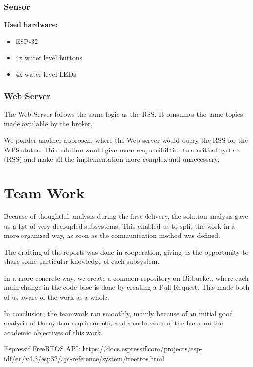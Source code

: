 \documentclass[11pt]{article}
\begin{document}
\subsubsection{Sensor}
\noindent
\textbf{Used hardware:}
\begin{itemize}
	\item ESP-32
	\item 4x water level buttons
	\item 4x water level LEDs
\end{itemize}

\subsubsection{Web Server}

The Web Server follows the same logic as the RSS. It consumes the same topics made available by the broker.

We ponder another approach, where the Web server would query the RSS for the WPS status. This solution would give more responsibilities to a critical system (RSS) and make all the implementation more complex and unnecessary.

\section{Team Work}

Because of thoughtful analysis during the first delivery, the solution analysis gave us a list of very decoupled subsystems. This enabled us to split the work in a more organized way, as soon as the communication method was defined.

The drafting of the reports was done in cooperation, giving us the opportunity to share some particular knowledge of each subsystem.

In a more concrete way, we create a common repository on Bitbucket, where each main change in the code base is done by creating a Pull Request. This made both of us aware of the work as a whole.

In conclusion, the teamwork ran smoothly, mainly because of an initial good analysis of the system requirements, and also because of the focus on the academic objectives of this work.

\newpage
\begin{thebibliography}{8}

 Espressif FreeRTOS API: {\url{https://docs.espressif.com/projects/esp-idf/en/v4.3/esp32/api-reference/system/freertos.html}}

\end{thebibliography}
\end{document}
